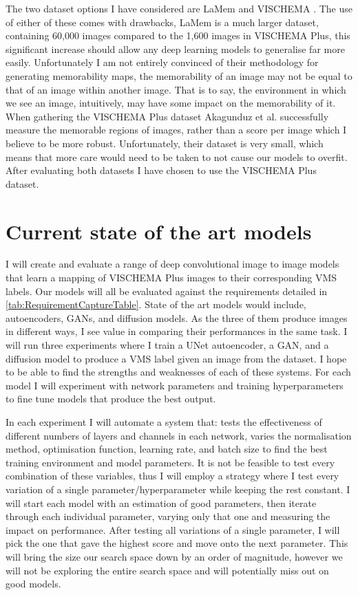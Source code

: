 \documentclass{UoYCSproject}
\begin{document}
The two dataset options I have considered are LaMem \cite{ICCV15_Khosla} and VISCHEMA \cite{VischemaPaper}. The use of either of these comes with drawbacks, LaMem is a much larger dataset, containing 60,000 images compared to the 1,600 images in VISCHEMA Plus, this significant increase should allow any deep learning models to generalise far more easily. Unfortunately I am not entirely convinced of their methodology for generating memorability maps, the memorability of an image may not be equal to that of an image within another image. That is to say, the environment in which we see an image, intuitively, may have some impact on the memorability of it.
When gathering the VISCHEMA Plus dataset  Akagunduz et al. successfully measure the memorable regions of images, rather than a score per image which I believe to be more robust. Unfortunately, their dataset is very small, which means that more care would need to be taken to not cause our models to overfit. After evaluating both datasets I have chosen to use the VISCHEMA Plus dataset. 

\section{Current state of the art models}

I will create and evaluate a range of deep convolutional image to image models that learn a mapping of VISCHEMA Plus images to their corresponding VMS labels. Our models will all be evaluated against the requirements detailed in \ref{tab:RequirementCaptureTable}. State of the art models would include, autoencoders, GANs, and diffusion models. As the three of them produce images in different ways, I see value in comparing their performances in the same task. I will run three experiments where I train a UNet autoencoder, a GAN, and a diffusion model to produce a VMS label given an image from the dataset. I hope to be able to find the strengths and weaknesses of each of these systems. For each model I will experiment with network parameters and training hyperparameters to fine tune models that produce the best output.

In each experiment I will automate a system that: tests the effectiveness of different numbers of layers and channels in each network, varies the normalisation method, optimisation function, learning rate, and batch size to find the best training environment and model parameters. It is not be feasible to test every combination of these variables, thus I will employ a strategy where I test every variation of a single parameter/hyperparameter while keeping the rest constant. I will start each model with an estimation of good parameters, then iterate through each individual parameter, varying only that one and measuring the impact on performance. After testing all variations of a single parameter, I will pick the one that gave the highest score and move onto the next parameter. This will bring the size our search space down by an order of magnitude, however we will not be exploring the entire search space and will potentially miss out on good models. 
\end{document}
